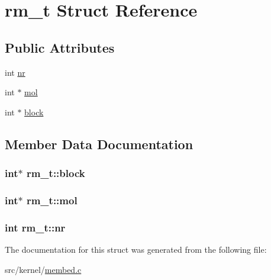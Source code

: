\hypertarget{structrm__t}{\section{rm\-\_\-t \-Struct \-Reference}
\label{structrm__t}
}
\subsection*{\-Public \-Attributes}
\begin{DoxyCompactItemize}
\item 
int \hyperlink{structrm__t_ae1867ae4b870ed7add7a6b216d037071}{nr}
\item 
int $\ast$ \hyperlink{structrm__t_a903990fb65fd096a11d1ade69755254b}{mol}
\item 
int $\ast$ \hyperlink{structrm__t_a2c1c200d60940dcff6e370f40fc82d90}{block}
\end{DoxyCompactItemize}


\subsection{\-Member \-Data \-Documentation}
\hypertarget{structrm__t_a2c1c200d60940dcff6e370f40fc82d90}{
\subsubsection[{block}]{\setlength{\rightskip}{0pt plus 5cm}int$\ast$ {\bf rm\-\_\-t\-::block}}}\label{structrm__t_a2c1c200d60940dcff6e370f40fc82d90}
\hypertarget{structrm__t_a903990fb65fd096a11d1ade69755254b}{
\subsubsection[{mol}]{\setlength{\rightskip}{0pt plus 5cm}int$\ast$ {\bf rm\-\_\-t\-::mol}}}\label{structrm__t_a903990fb65fd096a11d1ade69755254b}
\hypertarget{structrm__t_ae1867ae4b870ed7add7a6b216d037071}{
\subsubsection[{nr}]{\setlength{\rightskip}{0pt plus 5cm}int {\bf rm\-\_\-t\-::nr}}}\label{structrm__t_ae1867ae4b870ed7add7a6b216d037071}


\-The documentation for this struct was generated from the following file\-:\begin{DoxyCompactItemize}
\item 
src/kernel/\hyperlink{membed_8c}{membed.\-c}\end{DoxyCompactItemize}
